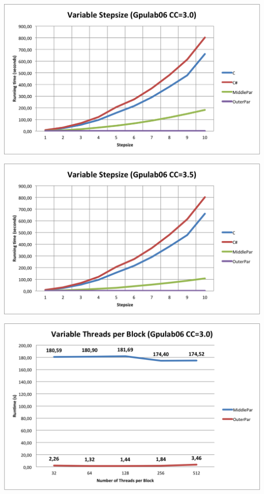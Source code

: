 \centerline{\includegraphics[width=\textwidth]{img/Gpulab-stepsize30.png}}

\centerline{\includegraphics[width=\textwidth]{img/Gpulab-stepsize35.png}}

\centerline{\includegraphics[width=\textwidth]{img/Gpulab-tpb30.png}}

